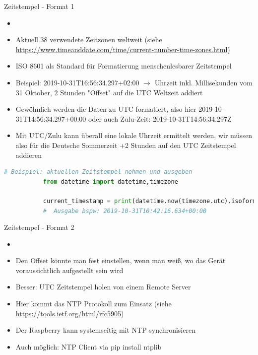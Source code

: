 \begin{frame}[fragile]{Zeitstempel - Format 1}
    \begin{itemize}
        \setlength{\itemindent}{2.4in}
        \item [\textbf{Wie sollten Zeitstempel formatiert sein?}]
    \end{itemize}

    \begin{itemize}
              \item Aktuell 38 verwendete Zeitzonen weltweit (siehe \url{https://www.timeanddate.com/time/current-number-time-zones.html})
               \item ISO 8601 als Standard für Formatierung menschenlesbarer Zeitstempel
               \item Beispiel: 2019-10-31T16:56:34.297+02:00 $\rightarrow$ Uhrzeit inkl. Millisekunden vom 31 Oktober, 2 Stunden "Offset" auf die UTC Weltzeit addiert
               \item Gewöhnlich werden die Daten zu UTC formatiert, also hier 2019-10-31T14:56:34.297+00:00 oder auch Zulu-Zeit: 2019-10-31T14:56:34.297Z
               \item Mit UTC/Zulu kann überall eine lokale Uhrzeit ermittelt werden, wir müssen also für die Deutsche Sommerzeit +2 Stunden auf den UTC Zeitstempel addieren
     \end{itemize}
       \begin{lstlisting}[language=Python, gobble=8]
        # Beispiel: aktuellen Zeitstempel nehmen und ausgeben
           from datetime import datetime,timezone

           current_timestamp = print(datetime.now(timezone.utc).isoformat(timespec='milliseconds')) # aktueller Zeitstempel
           #  Ausgabe bspw: 2019-10-31T10:42:16.634+00:00
        \end{lstlisting}

\end{frame}

\begin{frame}[fragile]{Zeitstempel - Format 2}
    \begin{itemize}
        \setlength{\itemindent}{2.4in}
        \item [\textbf{Aber woher bekommen wir den Offset?}]
    \end{itemize}

    \begin{itemize}
              \item  Den Offset könnte man fest einstellen, wenn man weiß, wo das Gerät voraussichtlich aufgestellt sein wird
               \item Besser: UTC Zeitstempel holen von einem Remote Server
               \item Hier kommt das NTP Protokoll zum Einsatz (siehe \url{https://tools.ietf.org/html/rfc5905})
               \item Der Raspberry kann systemseitig mit NTP synchronisieren
               \item Auch möglich: NTP Client via pip install ntplib
    \end{itemize}
\end{frame}

